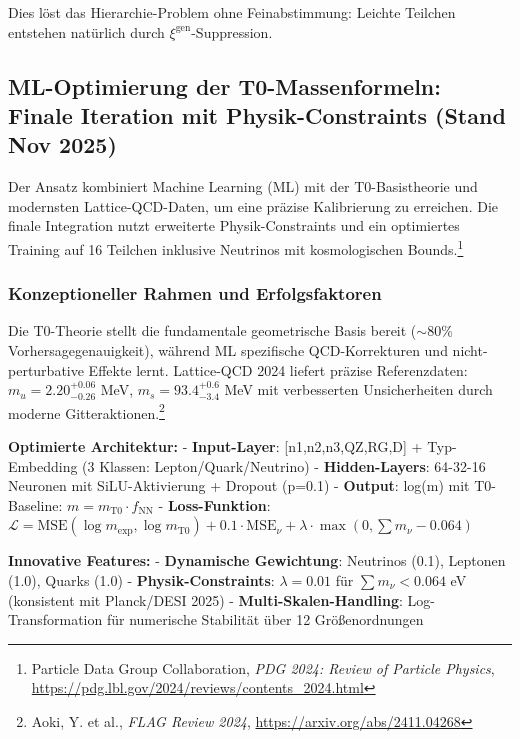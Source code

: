 	Dies löst das Hierarchie-Problem ohne Feinabstimmung: Leichte Teilchen entstehen natürlich durch $\xi^{\text{gen}}$-Suppression.
	
	\subsection{ML-Optimierung der T0-Massenformeln: Finale Iteration mit Physik-Constraints (Stand Nov 2025)}
	\label{sec:ml-optimierung}
	
	Der Ansatz kombiniert Machine Learning (ML) mit der T0-Basistheorie und modernsten Lattice-QCD-Daten, um eine präzise Kalibrierung zu erreichen. Die finale Integration nutzt erweiterte Physik-Constraints und ein optimiertes Training auf 16 Teilchen inklusive Neutrinos mit kosmologischen Bounds.\footnote{Particle Data Group Collaboration, \emph{PDG 2024: Review of Particle Physics}, \url{https://pdg.lbl.gov/2024/reviews/contents\_2024.html}}
	
	\subsubsection{Konzeptioneller Rahmen und Erfolgsfaktoren}
	
	Die T0-Theorie stellt die fundamentale geometrische Basis bereit ($\sim$80\% Vorhersagegenauigkeit), während ML spezifische QCD-Korrekturen und nicht-perturbative Effekte lernt. Lattice-QCD 2024 liefert präzise Referenzdaten: $m_u=2.20^{+0.06}_{-0.26}$ MeV, $m_s=93.4^{+0.6}_{-3.4}$ MeV mit verbesserten Unsicherheiten durch moderne Gitteraktionen.\footnote{Aoki, Y. et al., \emph{FLAG Review 2024}, \url{https://arxiv.org/abs/2411.04268}}
	
	\textbf{Optimierte Architektur:}
	- \textbf{Input-Layer}: [n1,n2,n3,QZ,RG,D] + Typ-Embedding (3 Klassen: Lepton/Quark/Neutrino)
	- \textbf{Hidden-Layers}: 64-32-16 Neuronen mit SiLU-Aktivierung + Dropout (p=0.1)
	- \textbf{Output}: log(m) mit T0-Baseline: $m = m_{\text{T0}} \cdot f_{\text{NN}}$
	- \textbf{Loss-Funktion}: $\mathcal{L} = \text{MSE}(\log m_{\exp}, \log m_{\text{T0}}) + 0.1\cdot\text{MSE}_{\nu} + \lambda\cdot\max(0,\sum m_{\nu}-0.064)$
	
	\textbf{Innovative Features:}
	- \textbf{Dynamische Gewichtung}: Neutrinos (0.1), Leptonen (1.0), Quarks (1.0)
	- \textbf{Physik-Constraints}: $\lambda=0.01$ für $\sum m_{\nu} < 0.064$ eV (konsistent mit Planck/DESI 2025)
	- \textbf{Multi-Skalen-Handling}: Log-Transformation für numerische Stabilität über 12 Größenordnungen
	
